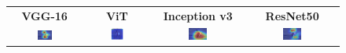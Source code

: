 \documentclass[a4paper,12pt]{report}
\begin{document}
\begin{figure}[H]
    \centering
    \setlength{\tabcolsep}{1pt}
    \begin{tabular}{cccc}
    \textbf{VGG-16} & \textbf{ViT} & \textbf{Inception v3} & \textbf{ResNet50} \\
    
    \includegraphics[width=0.22\textwidth]{images/appendix/modelgraph/vgg/correct/Slaty_Backed_Gull/480 (21).jpeg} &
    \includegraphics[width=0.22\textwidth]{images/appendix/modelgraph/vit/correct/Slaty_Backed_Gull/480 (21).jpeg} &
    \includegraphics[width=0.22\textwidth]{images/appendix/modelgraph/inception/correct/Slaty_Backed_Gull/480 (21).jpeg} &
    \includegraphics[width=0.22\textwidth]{images/appendix/modelgraph/resnet/correct/Slaty_Backed_Gull/480 (21).jpeg} \\
    \end{tabular}

    \label{fig:interpretability_slaty_8}
\end{figure}
\end{document}
